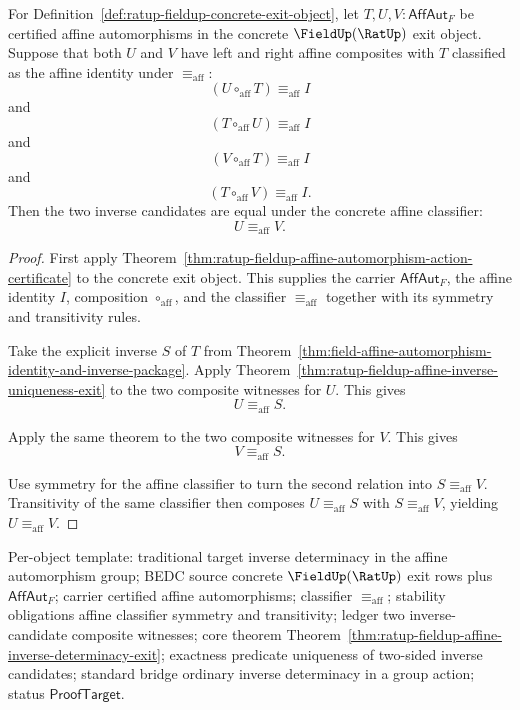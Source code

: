 \begin{theorem}
\label{thm:ratup-fieldup-affine-inverse-determinacy-exit}
For Definition~\ref{def:ratup-fieldup-concrete-exit-object}, let
$T,U,V:\mathsf{AffAut}_F$ be certified affine automorphisms in the concrete
$\FieldUp(\RatUp)$ exit object. Suppose that both $U$ and $V$ have left and
right affine composites with $T$ classified as the affine identity under
$\equiv_{\mathrm{aff}}$:
$$
(U\circ_{\mathrm{aff}}T)\equiv_{\mathrm{aff}} I
$$
and
$$
(T\circ_{\mathrm{aff}}U)\equiv_{\mathrm{aff}} I
$$
and
$$
(V\circ_{\mathrm{aff}}T)\equiv_{\mathrm{aff}} I
$$
and
$$
(T\circ_{\mathrm{aff}}V)\equiv_{\mathrm{aff}} I.
$$
Then the two inverse candidates are equal under the concrete affine classifier:
$$
U\equiv_{\mathrm{aff}}V.
$$
\end{theorem}
\begin{proof}
First apply Theorem~\ref{thm:ratup-fieldup-affine-automorphism-action-certificate}
to the concrete exit object. This supplies the carrier $\mathsf{AffAut}_F$, the
affine identity $I$, composition $\circ_{\mathrm{aff}}$, and the classifier
$\equiv_{\mathrm{aff}}$ together with its symmetry and transitivity rules.

Take the explicit inverse $S$ of $T$ from
Theorem~\ref{thm:field-affine-automorphism-identity-and-inverse-package}. Apply
Theorem~\ref{thm:ratup-fieldup-affine-inverse-uniqueness-exit} to the two
composite witnesses for $U$. This gives
$$
U\equiv_{\mathrm{aff}}S.
$$

Apply the same theorem to the two composite witnesses for $V$. This gives
$$
V\equiv_{\mathrm{aff}}S.
$$

Use symmetry for the affine classifier to turn the second relation into
$S\equiv_{\mathrm{aff}}V$. Transitivity of the same classifier then composes
$U\equiv_{\mathrm{aff}}S$ with $S\equiv_{\mathrm{aff}}V$, yielding
$U\equiv_{\mathrm{aff}}V$.
\end{proof}

Per-object template: traditional target inverse determinacy in the affine
automorphism group; BEDC source concrete $\FieldUp(\RatUp)$ exit rows plus
$\mathsf{AffAut}_F$; carrier certified affine automorphisms; classifier
$\equiv_{\mathrm{aff}}$; stability obligations affine classifier symmetry and
transitivity; ledger two inverse-candidate composite witnesses; core theorem
Theorem~\ref{thm:ratup-fieldup-affine-inverse-determinacy-exit}; exactness
predicate uniqueness of two-sided inverse candidates; standard bridge ordinary
inverse determinacy in a group action; status $\mathsf{ProofTarget}$.

